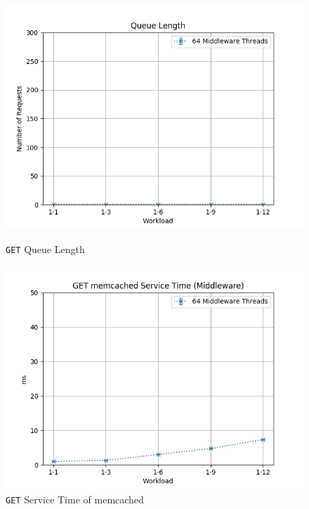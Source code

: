 \documentclass[11pt,a4paper]{article}
\begin{document}
%
\begin{figure}[H]
	\centering
	\captionsetup{width=0.4\textwidth}
    \begin{minipage}{0.5\textwidth}
        \includegraphics[width=\textwidth]{../illustrations/plots/4_2_full_system_read/64/middleware_queue_length.png}
        \caption{\texttt{GET} Queue Length}
        \label{fig:full_system_read_mw_ql}
    \end{minipage}\hfill
    \begin{minipage}{0.5\textwidth}
        \centering
        \includegraphics[width=\textwidth]{../illustrations/plots/4_2_full_system_read/64/middleware_get_service_time_ms.png}
        \caption{\texttt{GET} Service Time of memcached}
        \label{fig:full_system_read_mw_st}
    \end{minipage}
\end{figure}
\end{document}
